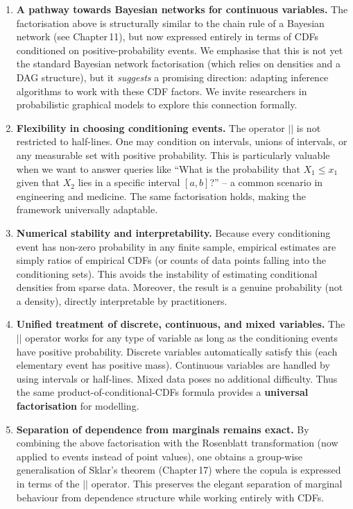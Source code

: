 \begin{enumerate}
    \item \textbf{A pathway towards Bayesian networks for continuous variables.}
    The factorisation above is structurally similar to the chain rule of a Bayesian network (see Chapter 11), but now expressed entirely in terms of CDFs conditioned on positive-probability events. We emphasise that this is not yet the standard Bayesian network factorisation (which relies on densities and a DAG structure), but it \emph{suggests} a promising direction: adapting inference algorithms to work with these CDF factors. We invite researchers in probabilistic graphical models to explore this connection formally.

    \item \textbf{Flexibility in choosing conditioning events.}
    The operator $||$ is not restricted to half-lines. One may condition on intervals, unions of intervals, or any measurable set with positive probability. This is particularly valuable when we want to answer queries like ``What is the probability that $X_1 \le x_1$ given that $X_2$ lies in a specific interval $[a,b]$?'' – a common scenario in engineering and medicine. The same factorisation holds, making the framework universally adaptable.

    \item \textbf{Numerical stability and interpretability.}
    Because every conditioning event has non-zero probability in any finite sample, empirical estimates are simply ratios of empirical CDFs (or counts of data points falling into the conditioning sets). This avoids the instability of estimating conditional densities from sparse data. Moreover, the result is a genuine probability (not a density), directly interpretable by practitioners.

    \item \textbf{Unified treatment of discrete, continuous, and mixed variables.}
    The $||$ operator works for any type of variable as long as the conditioning events have positive probability. Discrete variables automatically satisfy this (each elementary event has positive mass). Continuous variables are handled by using intervals or half-lines. Mixed data poses no additional difficulty. Thus the same product-of-conditional-CDFs formula provides a \textbf{universal factorisation} for modelling.

    \item \textbf{Separation of dependence from marginals remains exact.}
    By combining the above factorisation with the Rosenblatt transformation (now applied to events instead of point values), one obtains a group-wise generalisation of Sklar's theorem (Chapter 17) where the copula is expressed in terms of the $||$ operator. This preserves the elegant separation of marginal behaviour from dependence structure while working entirely with CDFs.
\end{enumerate}

